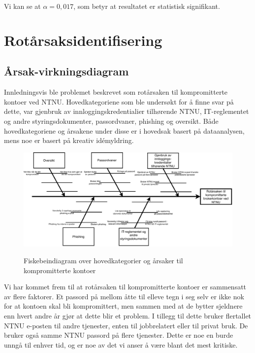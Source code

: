 Vi kan se at \(\alpha = 0,017\), som betyr at resultatet er statistisk signifikant. 


\section{Rotårsaksidentifisering}

\subsection{Årsak-virkningsdiagram}
Innledningsvis ble problemet beskrevet som rotårsaken til kompromitterte kontoer ved NTNU. Hovedkategoriene som ble undersøkt for å finne svar på dette, var gjenbruk av innloggingskredentialier tilhørende NTNU, IT-reglementet og andre styringsdokumenter, passordvaner, phishing og oversikt. Både hovedkategoriene og årsakene under disse er i hovedsak basert på dataanalysen, mens noe er basert på kreativ idémyldring. 

\begin{figure}[H]
    \centering
    \includegraphics[scale=0.65]{case_2/bilder/fiskebein.pdf}
    \label{fig:fiskebein-case2}
    \caption[Fiskebeindiagram for kompromitterte kontoer]{Fiskebeindiagram over hovedkategorier og årsaker til kompromitterte kontoer}
\end{figure}

Vi har kommet frem til at rotårsaken til kompromitterte kontoer er sammensatt av flere faktorer. Et passord på mellom åtte til elleve tegn i seg selv er ikke nok for at kontoen skal bli kompromittert, men sammen med at de bytter sjeldnere enn hvert andre år gjør at dette blir et problem. I tillegg til dette bruker flertallet NTNU e-posten til andre tjenester, enten til jobbrelatert eller til privat bruk. De bruker også samme NTNU passord på flere tjenester. Dette er noe en burde unngå til enhver tid, og er noe av det vi anser å være blant det mest kritiske. 

